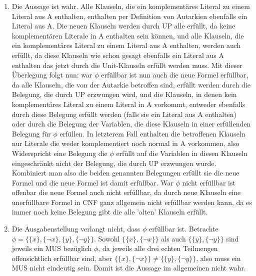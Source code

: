 \documentclass[a4paper,10pt]{article}
\begin{document}
\begin{enumerate}
\item Die Aussage ist wahr. Alle Klauseln, die ein komplementäres Literal zu einem Literal aus A enthalten, enthalten per Definition von Autarkien ebenfalls ein Literal aus A. Die neuen Klauseln werden durch UP alle erfüllt, da keine komplementären Literale in A enthalten sein können, und alle Klauseln, die ein komplementäres Literal zu einem Literal aus A enthalten,  werden auch erfüllt, da diese Klauseln wie schon gesagt ebenfalls ein Literal aus A enthalten das jetzt durch die Unit-Klauseln erfüllt werden muss. Mit dieser Überlegung folgt nun: war $\phi$ erfüllbar ist nun auch die neue Formel erfüllbar, da alle Klauseln, die von der Autarkie betroffen sind, erfüllt werden durch die Belegung, die durch UP erzwungen wird, und die Klauseln, in denen kein komplementäres Literal zu einem Literal in A vorkommt, entweder ebenfalls durch diese Belegung erfüllt werden (falls sie ein Literal aus A enthalten) oder durch die Belegung der Variablen, die diese Klauseln in einer erfüllenden Belegung für $\phi$ erfüllen. In letzterem Fall enthalten die betroffenen Klauseln nur Literale die weder komplementiert noch normal in A vorkommen, also Widerspricht eine Belegung die $\phi$ erfüllt auf die Variablen in diesen Klauseln eingeschränkt nicht der Belegung, die durch UP erzwungen wurde. Kombiniert man also die beiden genannten Belegungen erfüllt sie die neue Formel und die neue Formel ist damit erfüllbar. War $\phi$ nicht erfüllbar ist offenbar die neue Formel auch nicht erfüllbar, da durch neue Klauseln eine unerfüllbare Formel in CNF ganz allgemein nicht erfüllbar werden kann, da es immer noch keine Belegung gibt die alle 'alten' Klauseln erfüllt.

\item Die Ausgabenstellung verlangt nicht, dass $\phi$ erfüllbar ist. Betrachte $\phi = \{\{x\}, \{\neg x\}, \{y\}, \{\neg y\}\}$. Sowohl $\{\{x\}, \{\neg x\}\}$ als auch $\{\{y\},\{\neg y\}\}$ sind jeweils ein MUS bezüglich $\phi$, da jeweils alle drei echten Teilmengen offensichtlich erfüllbar sind, aber $\{\{x\}, \{\neg x\}\} \neq \{\{y\}, \{\neg y\}\}$, also muss ein MUS nicht eindeutig sein. Damit ist die Aussage im allgemeinen nicht wahr.


\end{enumerate}
\end{document}
